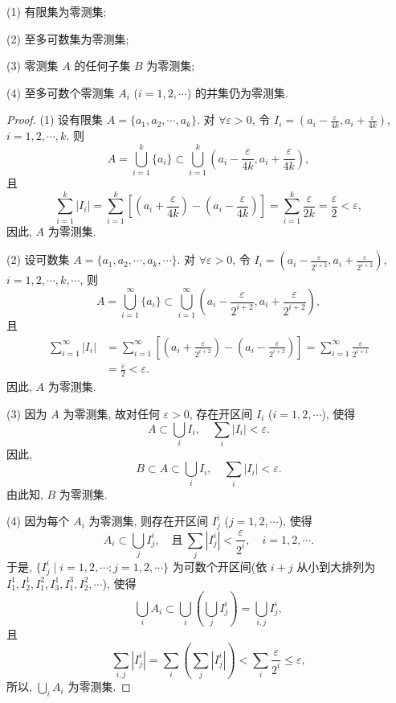\begin{lemma}\label{lem:6.1.6}
(1) 有限集为零测集;

(2) 至多可数集为零测集;

(3) 零测集 $A$ 的任何子集 $B$ 为零测集;

(4) 至多可数个零测集 $A_{i}$ ($i=1,2,\cdots$) 的并集仍为零测集.
\end{lemma}

\begin{proof}
(1) 设有限集 $A=\{a_{1},a_{2},\cdots,a_{k}\}$. 对 $\forall\varepsilon>0$, 令 $I_{i}=\left(a_{i}-\frac{\varepsilon}{4k},a_{i}+\frac{\varepsilon}{4k}\right)$, $i=1,2,\cdots,k$. 则
\[
A=\bigcup_{i=1}^{k}\{a_{i}\}\subset\bigcup_{i=1}^{k}\left(a_{i}-\frac{\varepsilon}{4k},a_{i}+\frac{\varepsilon}{4k}\right),
\]
且
\[
\sum_{i=1}^{k}|I_{i}|=\sum_{i=1}^{k}\left[\left(a_{i}+\frac{\varepsilon}{4k}\right)-\left(a_{i}-\frac{\varepsilon}{4k}\right)\right]=\sum_{i=1}^{k}\frac{\varepsilon}{2k}=\frac{\varepsilon}{2}<\varepsilon,
\]
因此, $A$ 为零测集.

(2) 设可数集 $A=\{a_{1},a_{2},\cdots,a_{k},\cdots\}$. 对 $\forall\varepsilon>0$, 令 $I_{i}=\left(a_{i}-\frac{\varepsilon}{2^{i+2}},a_{i}+\frac{\varepsilon}{2^{i+2}}\right)$, $i=1,2,\cdots,k,\cdots$, 则
\[
A=\bigcup_{i=1}^{\infty}\{a_{i}\}\subset\bigcup_{i=1}^{\infty}\left(a_{i}-\frac{\varepsilon}{2^{i+2}},a_{i}+\frac{\varepsilon}{2^{i+2}}\right),
\]
且
\begin{align*}
\sum_{i=1}^{\infty}|I_{i}|&=\sum_{i=1}^{\infty}\left[\left(a_{i}+\frac{\varepsilon}{2^{i+2}}\right)-\left(a_{i}-\frac{\varepsilon}{2^{i+2}}\right)\right]=\sum_{i=1}^{\infty}\frac{\varepsilon}{2^{i+1}}\\
&=\frac{\varepsilon}{2}<\varepsilon.
\end{align*}
因此, $A$ 为零测集.

(3) 因为 $A$ 为零测集, 故对任何 $\varepsilon>0$, 存在开区间 $I_{i}$ ($i=1,2,\cdots$), 使得
\[
A\subset\bigcup_{i}I_{i},\quad\sum_{i}|I_{i}|<\varepsilon.
\]
因此,
\[
B\subset A\subset\bigcup_{i}I_{i},\quad\sum_{i}|I_{i}|<\varepsilon.
\]
由此知, $B$ 为零测集.

(4) 因为每个 $A_{i}$ 为零测集, 则存在开区间 $I_{j}^{i}$ ($j=1,2,\cdots$), 使得
\[
A_{i}\subset\bigcup_{j}I_{j}^{i},\quad\text{且}\ \sum_{j}|I_{j}^{i}|<\frac{\varepsilon}{2^{i}},\quad i=1,2,\cdots.
\]
于是, $\{I_{j}^{i}\mid i=1,2,\cdots;j=1,2,\cdots\}$ 为可数个开区间\linebreak[4](依 $i+j$ 从小到大排列为 $I_{1}^{1},I_{2}^{1},\allowbreak I_{1}^{2},I_{3}^{1},\allowbreak I_{1}^{3},I_{2}^{2},\cdots$), 使得
\[
\bigcup_{i}A_{i}\subset\bigcup_{i}\left(\bigcup_{j}I_{j}^{i}\right)=\bigcup_{i,j}I_{j}^{i},
\]
且
\[
\sum_{i,j}|I_{j}^{i}|=\sum_{i}\left(\sum_{j}|I_{j}^{i}|\right)<\sum_{i}\frac{\varepsilon}{2^{i}}\leqslant\varepsilon,
\]
所以, $\bigcup_{i}A_{i}$ 为零测集.
\end{proof}

